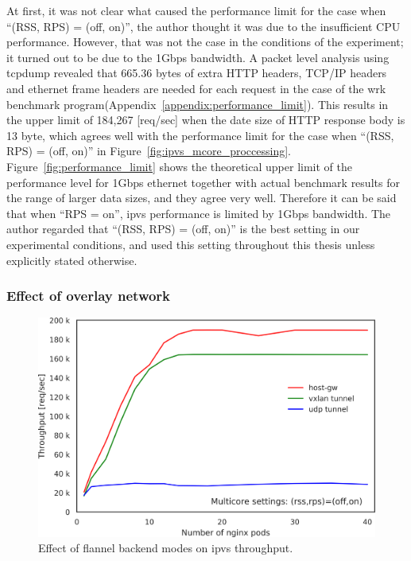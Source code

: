 At first, it was not clear what caused the performance limit for the case when \enquote{(RSS, RPS) = (off, on)},
the author thought it was due to the insufficient CPU performance.
However, that was not the case in the conditions of the experiment; it turned out to be due to the 1Gbps bandwidth.
A packet level analysis using tcpdump\cite{jacobson1989tcpdump} revealed that 665.36 bytes of extra HTTP headers,
TCP/IP headers and ethernet frame headers are needed for each request in the case of the wrk benchmark program(Appendix~\ref{appendix:performance_limit}).
This results in the upper limit of 184,267 [req/sec] when the date size of HTTP response body is 13 byte, which agrees well with the performance limit for the case when \enquote{(RSS, RPS) = (off, on)} in Figure~\ref{fig:ipvs_mcore_proccessing}.
Figure~\ref{fig:performance_limit} shows the theoretical upper limit of the performance level for 1Gbps ethernet together with actual benchmark results for the range of larger data sizes, and they agree very well.
Therefore it can be said that when \enquote{RPS = on}, ipvs performance is limited by 1Gbps bandwidth.
The author regarded that \enquote{(RSS, RPS) = (off, on)} is the best setting in our experimental conditions, and used this setting throughout this thesis unless explicitly stated otherwise.


\FloatBarrier

\subsubsection{Effect of overlay network}

\begin{figure}[h]
  \centering
  \includegraphics[width=0.8\columnwidth]{Figs/ipvs_flannel_mode}
  \caption{Effect of flannel backend modes on ipvs throughput.}
  \label{fig:ipvs_flannel_mode}
\end{figure}

